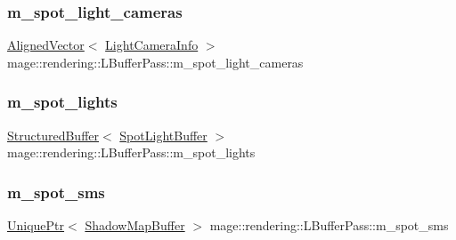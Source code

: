 \hypertarget{classmage_1_1rendering_1_1_l_buffer_pass_aa888c81683fc9be4cdfab1a49d03eac3}{}\label{classmage_1_1rendering_1_1_l_buffer_pass_aa888c81683fc9be4cdfab1a49d03eac3} 
\subsubsection{\texorpdfstring{m\+\_\+spot\+\_\+light\+\_\+cameras}{m\_spot\_light\_cameras}}
{\footnotesize\ttfamily \hyperlink{namespacemage_a8664bfb5ce2179fc64eae9f82c8a5ba8}{Aligned\+Vector}$<$ \hyperlink{structmage_1_1rendering_1_1_l_buffer_pass_1_1_light_camera_info}{Light\+Camera\+Info} $>$ mage\+::rendering\+::\+L\+Buffer\+Pass\+::m\+\_\+spot\+\_\+light\+\_\+cameras\hspace{0.3cm}{\ttfamily [private]}}

\hypertarget{classmage_1_1rendering_1_1_l_buffer_pass_abc2a2704d99a2a5335d28f3039d600ca}{}\label{classmage_1_1rendering_1_1_l_buffer_pass_abc2a2704d99a2a5335d28f3039d600ca} 
\subsubsection{\texorpdfstring{m\+\_\+spot\+\_\+lights}{m\_spot\_lights}}
{\footnotesize\ttfamily \hyperlink{classmage_1_1rendering_1_1_structured_buffer}{Structured\+Buffer}$<$ \hyperlink{structmage_1_1rendering_1_1_spot_light_buffer}{Spot\+Light\+Buffer} $>$ mage\+::rendering\+::\+L\+Buffer\+Pass\+::m\+\_\+spot\+\_\+lights\hspace{0.3cm}{\ttfamily [private]}}

\hypertarget{classmage_1_1rendering_1_1_l_buffer_pass_ae3030c5dea15584fd575679c68c6adc8}{}\label{classmage_1_1rendering_1_1_l_buffer_pass_ae3030c5dea15584fd575679c68c6adc8} 
\subsubsection{\texorpdfstring{m\+\_\+spot\+\_\+sms}{m\_spot\_sms}}
{\footnotesize\ttfamily \hyperlink{namespacemage_a3316d7143a973e37adf1110f2e80ca31}{Unique\+Ptr}$<$ \hyperlink{classmage_1_1rendering_1_1_shadow_map_buffer}{Shadow\+Map\+Buffer} $>$ mage\+::rendering\+::\+L\+Buffer\+Pass\+::m\+\_\+spot\+\_\+sms\hspace{0.3cm}{\ttfamily [private]}}

